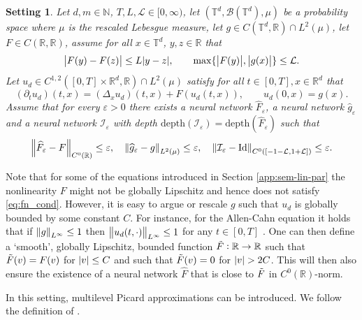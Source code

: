 \documentclass{article}
\numberwithin{equation}{section}
\newcommand{\depth}{\mathrm{depth}}
\newcommand{\Id}{\mathrm{Id}}
\newcommand{\T}{\mathbb{T}}
\newcommand{\R}{\mathbb{R}}
\newcommand{\N}{\mathbb{N}}
\newcommand{\cB}{\mathcal{B}}
\newcommand{\cI}{\mathcal{I}}
\newcommand{\cL}{\mathcal{L}}
\renewcommand{\epsilon}{\varepsilon}
\newcommand{\1}{\mathbbm{1}}
\newcommand{\Fhat}{\widehat{F}}
\newcommand{\ghat}{\widehat{g}}
\newtheorem{setting}[theorem]{Setting}%
\begin{document}
\begin{setting}\label{set:allen-cahn}
Let $d, m \in \N$, $T, L, \cL \in [0,\infty)$, 
let $(\T^d, \cB(\T^d), \mu)$ be a probability space where $\mu$ is the rescaled Lebesgue measure,
let $g \in C(\T^d,\R)\cap L^2(\mu)$, 
let $F \in C(\R,\R)$, assume for all  $x\in\T^d$, $y,z\in\R$ that
\begin{equation}\label{eq:fn_cond}
\abs{ F(y)-F(z) } \leq L \abs{ y-z }, \qquad \max\{\abs{ F(y) }, \abs{ g(x) } \} \le \cL. 
\end{equation}
Let $u_d\in C^{1,2}([0,T]\times \R^d, \R)\cap L^2(\mu)$ satisfy for all $t\in [0,T], x\in \R^d$ that
\begin{equation}\label{eq:PDE-AC}
   ( \partial_t u_d)(t,x) = (\Delta_x u_d)(t,x) + F(u_d(t,x)), \qquad u_d(0,x) = g(x). 
\end{equation}
Assume that for every $\epsilon>0$ there exists a neural network $\Fhat_\epsilon$, a neural network $\ghat_\epsilon$ and a neural network $\cI_\epsilon$ with depth $\depth(\cI_\epsilon)=\depth(\Fhat_\epsilon)$ such that
\begin{equation}\label{eq:nn-expressive}
     \norm{\Fhat_\epsilon-F}_{C^0(\R)} \leq \epsilon, \quad \norm{\ghat_\epsilon-g}_{L^2(\mu)} \leq \epsilon, \quad \norm{\cI_\epsilon-\Id}_{C^0([-1-\cL,1+\cL])}\leq \epsilon. 
\end{equation}
\end{setting}

Note that for some of the equations introduced in Section \ref{app:sem-lin-par} the nonlinearity $F$ might not be globally Lipschitz and hence does not satisfy \eqref{eq:fn_cond}. However, it is easy to argue or rescale $g$ \cite{LMK1, beck2020overcoming} such that $u_d$ is globally bounded by some constant $C$. For instance, for the Allen-Cahn equation it holds that if $\norm{g}_{L^\infty}\leq 1$ then $\norm{u_d(t,\cdot)}_{L^\infty}\leq 1$ for any $t\in[0,T]$ \cite{yang2018uniform}.
One can then define a `smooth', globally Lipschitz, bounded function $\Tilde{F}:\R\to\R$ such that $\Tilde{F}(v) = F(v)$ for $\abs{v}\leq C$ and such that $\Tilde{F}(v)=0$ for $\abs{v}>2C$. This will then also ensure the existence of a neural network $\Fhat$ that is close to $\Tilde{F}$ in $C^0(\R)$-norm. 

In this setting, multilevel Picard approximations can be introduced. We follow the definition of \cite{aj2021mlp}.
\end{document}
